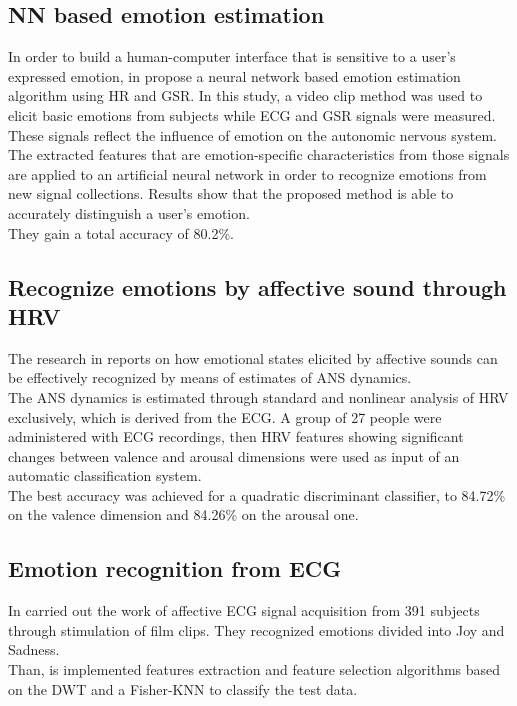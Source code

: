 \subsection{NN based emotion estimation}
In order to build a human-computer interface that is sensitive to a user's expressed emotion, in \cite{yoo2005neural} propose a neural network based emotion estimation algorithm using HR and GSR. In this study, a video clip method was used to elicit basic emotions from subjects while ECG and GSR signals were measured. These signals reflect the influence of emotion on the autonomic nervous system. The extracted features that are emotion-specific characteristics from those signals are applied to an artificial neural network in order to recognize emotions from new signal collections. Results show that the proposed method is able to accurately distinguish a user's emotion.
\\ They gain a total accuracy of 80.2\%.

\subsection{Recognize emotions by affective sound through HRV}
The research in \cite{nardelli2015recognizing} reports on how emotional states elicited by affective sounds can be effectively recognized by means of estimates of ANS dynamics.
\\ \indent
The ANS dynamics is estimated through standard and nonlinear analysis of HRV exclusively, which is derived from the ECG. A group of 27 people were administered with ECG recordings, then HRV features showing significant changes between valence and arousal dimensions were used as input of an automatic classification system.
\\ \indent
The best accuracy was achieved for a quadratic discriminant classifier, to 84.72\% on the valence dimension and 84.26\% on the arousal one. 

\subsection{Emotion recognition from ECG}
In \cite{cai2009research} carried out the work of affective ECG signal acquisition from 391 subjects through stimulation of film clips. They recognized emotions divided into Joy and Sadness.
\\
Than, is implemented features extraction and feature selection algorithms based on the DWT and a Fisher-KNN to classify the test data.

